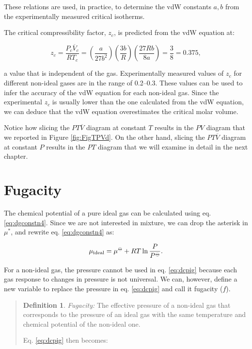 \documentclass[
  9pt,
]{extbook}
\theoremstyle{definition}
\newtheorem{definition}{Definition}[chapter]
\theoremstyle{definition}
\theoremstyle{definition}
\theoremstyle{remark}
\begin{document}
These relations are used, in practice, to determine the vdW constants \(a,b\) from the experimentally measured critical isotherms.

The critical compressibility factor, \(z_c\), is predicted from the vdW equation at:

\begin{equation}
z_c=\frac{P_c \overline{V}_c}{R T_c}=\left( \frac{a}{27b^2} \right) \left( \frac{3b}{R} \right) \left( \frac{27Rb}{8a} \right) = \frac{3}{8} = 0.375,
\label{eq:critiz}
\end{equation}

a value that is independent of the gas. Experimentally measured values of \(z_c\) for different non-ideal gases are in the range of 0.2--0.3. These values can be used to infer the accuracy of the vdW equation for each non-ideal gas. Since the experimental \(z_c\) is usually lower than the one calculated from the vdW equation, we can deduce that the vdW equation overestimates the critical molar volume.

Notice how slicing the \(PT\overline{V}\) diagram at constant \(T\) results in the \(PV\) diagram that we reported in Figure \ref{fig:FigTPVd}. On the other hand, slicing the \(PT\overline{V}\) diagram at constant \(P\) results in the \(PT\) diagram that we will examine in detail in the next chapter.

\hypertarget{fugacity}{%
\section{Fugacity}\label{fugacity}}

The chemical potential of a pure ideal gas can be calculated using eq. \eqref{eq:dgconstn4}. Since we are not interested in mixture, we can drop the asterisk in \(\mu^*\), and rewrite eq. \eqref{eq:dgconstn4} as:

\begin{equation}
\mu_{\text{ideal}} = \mu^{-\kern-6pt{\ominus}\kern-6pt-}+ RT \ln \frac{P}{P^{-\kern-6pt{\ominus}\kern-6pt-}}.
\label{eq:dcpig}
\end{equation}

For a non-ideal gas, the pressure cannot be used in eq. \eqref{eq:dcpig} because each gas response to changes in pressure is not universal. We can, however, define a new variable to replace the pressure in eq. \eqref{eq:dcpig} and call it fugacity (\(f\)).

\begin{quote}
\begin{definition}
\protect\hypertarget{def:fugacitydef}{}{\label{def:fugacitydef} }\emph{Fugacity:} The effective pressure of a non-ideal gas that corresponds to the pressure of an ideal gas with the same temperature and chemical potential of the non-ideal one.
\end{definition}

Eq. \eqref{eq:dcpig} then becomes:
\end{quote}
\end{document}
